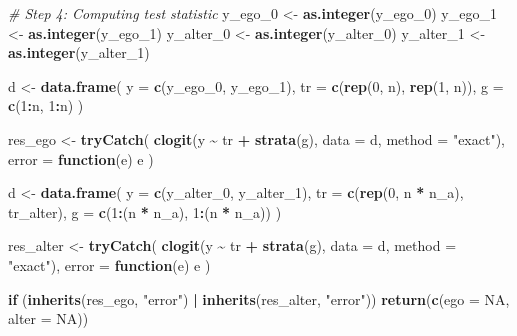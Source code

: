 \documentclass[
]{book}
\newenvironment{Shaded}{\begin{snugshade}}{\end{snugshade}}
\newcommand{\AttributeTok}[1]{\textcolor[rgb]{0.13,0.29,0.53}{#1}}
\newcommand{\CommentTok}[1]{\textcolor[rgb]{0.56,0.35,0.01}{\textit{#1}}}
\newcommand{\ConstantTok}[1]{\textcolor[rgb]{0.56,0.35,0.01}{#1}}
\newcommand{\ControlFlowTok}[1]{\textcolor[rgb]{0.13,0.29,0.53}{\textbf{#1}}}
\newcommand{\DecValTok}[1]{\textcolor[rgb]{0.00,0.00,0.81}{#1}}
\newcommand{\FunctionTok}[1]{\textcolor[rgb]{0.13,0.29,0.53}{\textbf{#1}}}
\newcommand{\NormalTok}[1]{#1}
\newcommand{\OtherTok}[1]{\textcolor[rgb]{0.56,0.35,0.01}{#1}}
\newcommand{\SpecialCharTok}[1]{\textcolor[rgb]{0.81,0.36,0.00}{\textbf{#1}}}
\newcommand{\StringTok}[1]{\textcolor[rgb]{0.31,0.60,0.02}{#1}}
\begin{document}
\begin{Shaded}
\begin{Highlighting}[]
  \CommentTok{\# Step 4: Computing test statistic}
\NormalTok{  y\_ego\_0 }\OtherTok{\textless{}{-}} \FunctionTok{as.integer}\NormalTok{(y\_ego\_0)}
\NormalTok{  y\_ego\_1 }\OtherTok{\textless{}{-}} \FunctionTok{as.integer}\NormalTok{(y\_ego\_1)}
\NormalTok{  y\_alter\_0 }\OtherTok{\textless{}{-}} \FunctionTok{as.integer}\NormalTok{(y\_alter\_0)}
\NormalTok{  y\_alter\_1 }\OtherTok{\textless{}{-}} \FunctionTok{as.integer}\NormalTok{(y\_alter\_1)}

\NormalTok{  d }\OtherTok{\textless{}{-}} \FunctionTok{data.frame}\NormalTok{(}
    \AttributeTok{y  =} \FunctionTok{c}\NormalTok{(y\_ego\_0, y\_ego\_1),}
    \AttributeTok{tr =} \FunctionTok{c}\NormalTok{(}\FunctionTok{rep}\NormalTok{(}\DecValTok{0}\NormalTok{, n), }\FunctionTok{rep}\NormalTok{(}\DecValTok{1}\NormalTok{, n)),}
    \AttributeTok{g  =} \FunctionTok{c}\NormalTok{(}\DecValTok{1}\SpecialCharTok{:}\NormalTok{n, }\DecValTok{1}\SpecialCharTok{:}\NormalTok{n)}
\NormalTok{  )}

\NormalTok{  res\_ego   }\OtherTok{\textless{}{-}} \FunctionTok{tryCatch}\NormalTok{(}
    \FunctionTok{clogit}\NormalTok{(y }\SpecialCharTok{\textasciitilde{}}\NormalTok{ tr }\SpecialCharTok{+} \FunctionTok{strata}\NormalTok{(g), }\AttributeTok{data =}\NormalTok{ d, }\AttributeTok{method =} \StringTok{"exact"}\NormalTok{),}
    \AttributeTok{error =} \ControlFlowTok{function}\NormalTok{(e) e}
\NormalTok{    )}

\NormalTok{  d }\OtherTok{\textless{}{-}} \FunctionTok{data.frame}\NormalTok{(}
    \AttributeTok{y  =} \FunctionTok{c}\NormalTok{(y\_alter\_0, y\_alter\_1),}
    \AttributeTok{tr =} \FunctionTok{c}\NormalTok{(}\FunctionTok{rep}\NormalTok{(}\DecValTok{0}\NormalTok{, n }\SpecialCharTok{*}\NormalTok{ n\_a), tr\_alter),}
    \AttributeTok{g  =} \FunctionTok{c}\NormalTok{(}\DecValTok{1}\SpecialCharTok{:}\NormalTok{(n }\SpecialCharTok{*}\NormalTok{ n\_a), }\DecValTok{1}\SpecialCharTok{:}\NormalTok{(n }\SpecialCharTok{*}\NormalTok{ n\_a))}
\NormalTok{  )}

\NormalTok{  res\_alter }\OtherTok{\textless{}{-}} \FunctionTok{tryCatch}\NormalTok{(}
    \FunctionTok{clogit}\NormalTok{(y }\SpecialCharTok{\textasciitilde{}}\NormalTok{ tr }\SpecialCharTok{+} \FunctionTok{strata}\NormalTok{(g), }\AttributeTok{data =}\NormalTok{ d, }\AttributeTok{method =} \StringTok{"exact"}\NormalTok{),}
    \AttributeTok{error =} \ControlFlowTok{function}\NormalTok{(e) e}
\NormalTok{    )}

  \ControlFlowTok{if}\NormalTok{ (}\FunctionTok{inherits}\NormalTok{(res\_ego, }\StringTok{"error"}\NormalTok{) }\SpecialCharTok{|} \FunctionTok{inherits}\NormalTok{(res\_alter, }\StringTok{"error"}\NormalTok{))}
    \FunctionTok{return}\NormalTok{(}\FunctionTok{c}\NormalTok{(}\AttributeTok{ego =}  \ConstantTok{NA}\NormalTok{, }\AttributeTok{alter =} \ConstantTok{NA}\NormalTok{))}
  

\end{Highlighting}
\end{Shaded}
\end{document}
